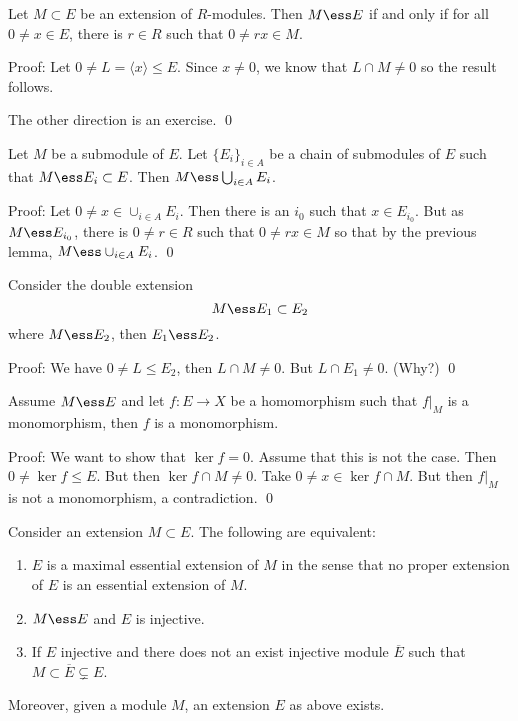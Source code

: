 \begin{lem}
Let $M \subset E$ be an extension of $R$-modules. Then $M \ess E$ if and only if for all $0 \neq x \in E$, there is $r \in R$ such that $0 \neq rx \in M$. 
\end{lem}

Proof: Let $0\neq L=\langle x \rangle \leq E$. Since $x \neq 0$, we know that $L \cap M \neq 0$ so the result follows. 

The other direction is an exercise. \qed \\

\begin{lem}\label{zornlemuse}
Let $M$ be a submodule of $E$. Let $\{E_i\}_{i \in A}$ be a chain of submodules of $E$ such that $M \ess E_i \subset E$. Then $M \ess \bigcup_{i \in A} E_i$.
\end{lem}

Proof: Let $0 \neq x \in \cup_{i \in A} E_i$. Then there is an $i_0$ such that $x \in E_{i_0}$. But as $M \ess E_{i_0}$, there is $0 \neq r \in R$ such that $0 \neq rx \in M$ so that by the previous lemma, $M \ess \cup_{i \in A} E_i$. \qed \\

\begin{lem}
Consider the double extension
\[
M \ess E_1 \subset E_2
\]
where $M \ess E_2$, then $E_1 \ess E_2$. 
\end{lem}

Proof: We have $0 \neq L \leq E_2$, then $L \cap M \neq 0$. But $L \cap E_1 \neq 0$. (Why?) \qed \\

\begin{lem}\label{lemmono}
Assume $M \ess E$ and let $f: E \rightarrow X$ be a homomorphism such that $f|_M$ is a monomorphism, then $f$ is a monomorphism. 
\end{lem}

Proof: We want to show that $\ker f=0$. Assume that this is not the case. Then $0 \neq \ker f \leq E$. But then $\ker f \cap M \neq 0$. Take $0 \neq x \in \ker f \cap M$. But then $f|_M$ is not a monomorphism, a contradiction. \qed \\

\begin{thm}
Consider an extension $M \subset E$. The following are equivalent:
\begin{enumerate}[1.]
\item $E$ is a maximal essential extension of $M$ in the sense that no proper extension of $E$ is an essential extension of $M$.
\item $M \ess E$ and $E$ is injective.
\item If $E$ injective and there does not an exist injective module $\overline{E}$ such that $M \subset \overline{E} \subsetneq E$. 
\end{enumerate}
Moreover, given a module $M$, an extension $E$ as above exists. 
\end{thm}

